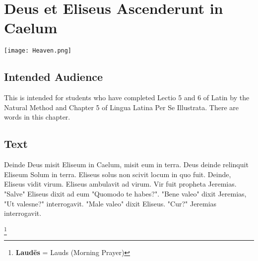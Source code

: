 \chapter{Deus et Eliseus Ascenderunt in Caelum}
\begin{center}
\texttt{[image: Heaven.png]}
\end{center}

\section{Intended Audience}
This is intended for students who have completed Lectio 5 and 6 of Latin by the Natural Method and Chapter 5 of Lingua Latina Per Se Illustrata. There are words in this chapter.

\section{Text}
Deinde Deus misit Eliseum in Caelum, misit eum in terra. Deus deinde relinquit Eliseum Solum in terra. Eliseus solus non scivit locum in quo fuit. Deinde, Eliseus vidit virum. Eliseus ambulavit ad virum. Vir fuit propheta Jeremias. "Salve" Eliseus dixit ad eum "Quomodo te habes?". "Bene valeo" dixit Jeremias, "Ut valesne?" interrogavit. "Male valeo" dixit Eliseus. "Cur?" Jeremias interrogavit.

\footnote{\textbf{Laudēs} = Lauds (Morning Prayer)}

